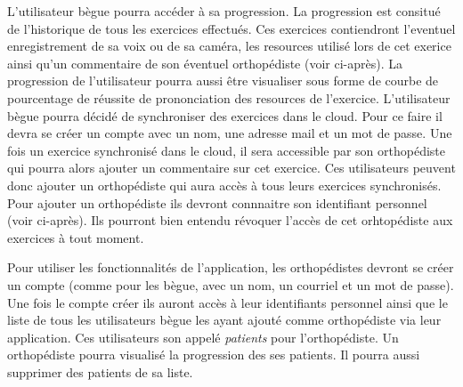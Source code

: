 L'utilisateur bègue pourra accéder à sa progression. La progression est consitué de l'historique de tous les exercices effectués. Ces exercices contiendront l'eventuel enregistrement de sa voix ou de sa caméra, les resources utilisé lors de cet exerice ainsi qu'un commentaire de son éventuel orthopédiste (voir ci-après). La progression de l'utilisateur pourra aussi être visualiser sous forme de courbe de pourcentage de réussite de prononciation des resources de l'exercice. L'utilisateur bègue pourra décidé de synchroniser des exercices dans le cloud. Pour ce faire il devra se créer un compte avec un nom, une adresse mail et un mot de passe. Une fois un exercice synchronisé dans le cloud, il sera accessible par son orthopédiste qui pourra alors ajouter un commentaire sur cet exercice. Ces utilisateurs peuvent donc ajouter un orthopédiste qui aura accès à tous leurs exercices synchronisés. Pour ajouter un orthopédiste ils devront connnaitre son identifiant personnel (voir ci-après). Ils pourront bien entendu révoquer l'accès de cet orhtopédiste aux exercices à tout moment.

Pour utiliser les fonctionnalités de l'application, les orthopédistes devront se créer un compte (comme pour les bègue, avec un nom, un courriel et un mot de passe). Une fois le compte créer ils auront accès à leur identifiants personnel ainsi que le liste de tous les utilisateurs bègue les ayant ajouté comme orthopédiste via leur application. Ces utilisateurs son appelé \textit{patients} pour l'orthopédiste. Un orthopédiste pourra visualisé la progression des ses patients. Il pourra aussi supprimer des patients de sa liste.















